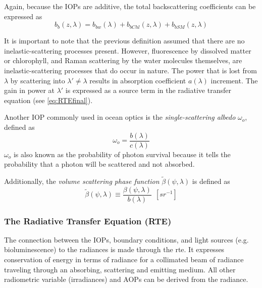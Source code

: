 Again, because the IOPs are additive, the total backscattering coefficients can be expressed as
\begin{equation}\label{eq:b_btotal}
  b_b(z,\lambda) =  b_{bw}(\lambda) + b_{bChl}(z,\lambda)+b_{bSM}(z,\lambda)
\end{equation}

It is important to note that the previous definition assumed that there are no inelastic-scattering processes present. However, fluorescence by dissolved matter or chlorophyll, and Raman scattering by the water molecules themselves, are inelastic-scattering processes that do occur in nature. The power that is lost from $\lambda$ by scattering into $\lambda'\neq\lambda$ results in absorption coefficient $a(\lambda)$ increment. The gain in power at $\lambda'$ is expressed as a source term in the radiative transfer equation (see \autoref{eq:RTEfinal}).

Another IOP commonly used in ocean optics is the {\it single-scattering albedo}  $\omega_o$, defined as
\begin{equation}
  \omega_o=\frac{b(\lambda)}{c(\lambda)}
\end{equation}
$\omega_o$ is also known as the probability of photon survival because it tells the probability that a photon will be scattered and not absorbed.

Additionally, the {\it volume scattering phase function} $\tilde{\beta}(\psi,\lambda)$  is defined as
\begin{equation}
  \tilde{\beta}(\psi,\lambda)\equiv \frac{\beta(\psi,\lambda)}{b(\lambda)}~~\left[sr^{-1} \right]
\end{equation}

\subsubsection*{The Radiative Transfer Equation (RTE)}
The connection between the IOPs, boundary conditions, and light sources (e.g. bioluminescence) to the radiances is made through the \gls{rte}. It expresses conservation of energy in terms of radiance for a collimated beam of radiance traveling through an absorbing, scattering and emitting medium. All other radiometric variable (irradiances) and AOPs can be derived from the radiance.

